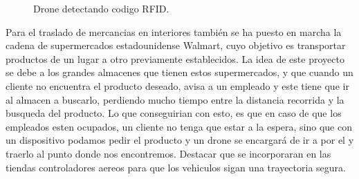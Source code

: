 \begin{figure}[H]
 \centering
 \caption{Drone detectando codigo RFID.}
 \label{f:Drone detecta codigo RFID}
\end{figure} 


\hspace{1 cm} Para el traslado de mercancias en interiores tambi\'en se ha puesto en marcha la cadena de supermercados estadounidense Walmart, cuyo objetivo es transportar productos de un lugar a otro previamente establecidos. La idea de este proyecto se debe a los grandes almacenes que tienen estos supermercados, y que cuando un cliente no encuentra el producto deseado, avisa a un empleado y este tiene que ir al almacen a buscarlo, perdiendo mucho tiempo entre la distancia recorrida y la busqueda del producto. Lo que conseguirian con esto, es que en caso de que los empleados esten ocupados, un cliente no tenga que estar a la espera, sino que con un dispositivo podamos pedir el producto y un drone se encargar\'a de ir a por el y traerlo al punto donde nos encontremos. Destacar que se incorporaran en las tiendas controladores aereos para que los vehiculos sigan una trayectoria segura.  



